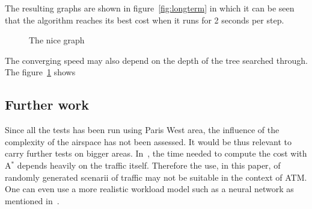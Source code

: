 \documentclass[oneside,twocolumn]{article}
\begin{document}
The resulting graphs are shown in figure~\ref{fig:longterm} in which it can be
seen that the algorithm reaches its best cost when it runs for 2 seconds per
step.

\begin{figure}
  \caption{The nice graph}\label{fig:timedepth}
\end{figure}

The converging speed may also depend on the depth of the tree searched through.
The figure~\ref{fig:timedepth} shows



\subsection{Further work}
Since all the tests has been run using Paris West area, the influence of the
complexity of the airspace has not been assessed. It would be thus relevant to
carry further tests on bigger areas. In~\cite{ferrari2017}, the time needed to
compute the cost with A\(^*\) depends heavily on the traffic itself. Therefore
the use, in this paper, of randomly generated scenarii of traffic may not be
suitable in the context of ATM. One can even use a more realistic workload model
such as a neural network as mentioned in~\cite{gianazza2010forecasting}.



\end{document}

